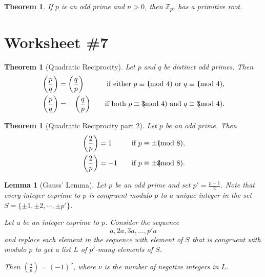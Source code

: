 \documentclass[12pt]{amsart}
\newcommand{\Z}{\mathbb{Z}}
\numberwithin{equation}{section}
\theoremstyle{plain} %
\newtheorem{thm}	[section]	{Theorem}
\newtheorem{lem}	[section]	{Lemma}
\begin{document}
\begin{thm} If $p$ is an odd prime and $n>0$, then $\Z_{p^n}$ has a primitive root.
\end{thm}


\section*{Worksheet \#7}

\begin{thm}[Quadratic Reciprocity] Let $p$ and $q$ be distinct odd primes. Then
\[\begin{aligned} &\left( \frac{p}{q} \right) = \left( \frac{q}{p} \right) \quad &\text{if either} \ p\equiv 1\hspace{-3mm}\pmod 4 \ \text{or} \ q \equiv 1\hspace{-3mm}\pmod 4, \\
&\left( \frac{p}{q} \right) =- \left( \frac{q}{p} \right) \quad &\text{if both} \ p\equiv 3\hspace{-3mm}\pmod 4 \ \text{and} \ q\equiv 3\hspace{-3mm}\pmod 4. \end{aligned} \]
\end{thm}



\begin{thm}[Quadratic Reciprocity part 2] Let $p$ be an odd prime. Then
\[\begin{aligned} &\left( \frac{2}{p} \right) = 1 \quad &\text{if} \ p\equiv \pm 1\hspace{-3mm}\pmod 8,  \\
&\left( \frac{2}{p} \right) = -1 \quad &\text{if} \ p\equiv \pm 3\hspace{-3mm}\pmod 8.  \\ \end{aligned} \]
\end{thm}

\begin{lem}[Gauss' Lemma] Let $p$ be an odd prime and set $p' = \frac{p-1}{2}$. Note that every integer coprime to $p$ is congruent modulo $p$ to a unique integer  in the set $S= \{\pm1, \pm 2,\cdots, \pm p'\}$.

 Let $a$ be an integer coprime to $p$. Consider the sequence
\[ a, 2a, 3a, \dots, p'a \] and replace each element in the sequence with element of $S$ that is congruent with modulo $p$ to get a list $L$ of $p'$-many elements of $S$.

Then $\displaystyle \left( \frac{a}{p} \right) = (-1)^\nu$, where $\nu$ is the number of negative integers in $L$.
\end{lem}
\end{document}
